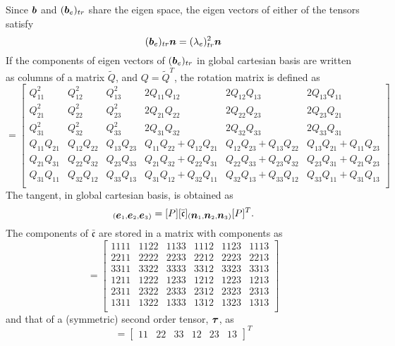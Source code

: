 \documentclass[11pt,twoside,TimesRoman]{article}
\begin{document}
Since $\mbox{\boldmath $b$}$ and $(\mbox{\boldmath $b$}_e)_{tr}$ share the eigen space, the eigen vectors of either of the tensors satisfy
\begin{equation}
	(\mbox{\boldmath $b$}_e)_{tr} \mbox{\boldmath $n$} = (\lambda_e)_{tr}^2 \mbox{\boldmath $n$} 
\end{equation}
If the components of eigen vectors of $(\mbox{\boldmath $b$}_e)_{tr}$ in global cartesian basis are written as columns of a matrix $\tilde{Q}$, and $Q = \tilde{Q}^T$, the rotation matrix is defined as 
\begin{equation}
	[P] = \begin{bmatrix}
			Q_{11}^2 & Q_{12}^2 & Q_{13}^2 & 2Q_{11}Q_{12} & 2Q_{12}Q_{13} & 2Q_{13}Q_{11} \\			
			Q_{21}^2 & Q_{22}^2 & Q_{23}^2 & 2Q_{21}Q_{22} & 2Q_{22}Q_{23} & 2Q_{23}Q_{21} \\
			Q_{31}^2 & Q_{32}^2 & Q_{33}^2 & 2Q_{31}Q_{32} & 2Q_{32}Q_{33} & 2Q_{33}Q_{31} \\
			Q_{11}Q_{21} & Q_{12}Q_{22} & Q_{13}Q_{23} & Q_{11}Q_{22}+Q_{12}Q_{21} & Q_{12}Q_{23}+Q_{13}Q_{22} & Q_{13}Q_{21}+Q_{11}Q_{23} \\
			Q_{21}Q_{31} & Q_{22}Q_{32} & Q_{23}Q_{33} & Q_{21}Q_{32}+Q_{22}Q_{31} & Q_{22}Q_{33}+Q_{23}Q_{32} & Q_{23}Q_{31}+Q_{21}Q_{23} \\
			Q_{31}Q_{11} & Q_{32}Q_{12} & Q_{33}Q_{13} & Q_{31}Q_{12}+Q_{32}Q_{11} & Q_{32}Q_{13}+Q_{33}Q_{12} & Q_{33}Q_{11}+Q_{31}Q_{13} \\
		  \end{bmatrix}
\end{equation}
The tangent, in global cartesian basis, is obtained as
\begin{equation}
	[\bar{\mathfrak{c}}]_{(\bfe_1,\bfe_2,\bfe_3)} = [P]	[\bar{\mathfrak{c}}]_{(\bfn_1,\bfn_2,\bfn_3)} [P]^T.
\end{equation}
The components of $\bar{\mathfrak{c}}$ are stored in a matrix with components as 
\begin{equation}
	[\bar{\mathfrak{c}}] = \begin{bmatrix}
	1111 & 1122 & 1133 & 1112 & 1123 & 1113 \\			
	2211 & 2222 & 2233 & 2212 & 2223 & 2213 \\			
	3311 & 3322 & 3333 & 3312 & 3323 & 3313 \\			
	1211 & 1222 & 1233 & 1212 & 1223 & 1213 \\			
	2311 & 2322 & 2333 & 2312 & 2323 & 2313 \\			
	1311 & 1322 & 1333 & 1312 & 1323 & 1313 \\			
\end{bmatrix}
\end{equation}
and that of a (symmetric) second order tensor, $\mbox{\boldmath $\tau$}$, as 
\begin{equation}
[\bftau] = \begin{bmatrix}
11 & 22 & 33 & 12 & 23 & 13
\end{bmatrix}^T
\end{equation}
\end{document}
